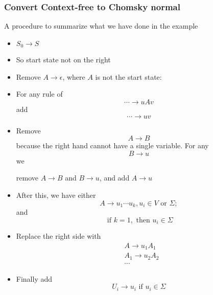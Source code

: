 




\begin{frame}[allowframebreaks] \frametitle{Convert Context-free to Chomsky normal}

  A procedure to summarize what we have done in the example
  
  \begin{itemize}
\item $S_0 \rightarrow S$

\item [] So start state not on the right
\item Remove $A \rightarrow \epsilon$, where $A$ is not the start state:
\item[] For any rule of
  \begin{equation*}
\cdots  \rightarrow uAv 
\end{equation*}
 add
 \begin{equation*}
\cdots \rightarrow uv
\end{equation*}
\item Remove
  \begin{equation*}
  A \rightarrow B
\end{equation*}
because the right hand cannot have a single variable.
For any
\begin{equation*}
  B \rightarrow u
\end{equation*}
we
\begin{center}
remove $A \rightarrow B$ and   $B \rightarrow u$,
and add $A \rightarrow u$
\end{center}
\item After this, we have either
  \begin{equation*}
    A \rightarrow u_1 \cdots u_k, u_i \in V
      \mbox{ or } \Sigma;
\end{equation*}
and 
\begin{equation*}
\mbox{ if }
k = 1, \mbox{ then } u_i \in \Sigma
\end{equation*}
\item Replace the right side with
  \begin{equation*}
    \begin{split}
& A \rightarrow u_1A_1 \\
& A_1 \rightarrow u_2A_2 \\
& \cdots
\end{split}
\end{equation*}
\item Finally add
  \begin{equation*}
U_i \rightarrow u_i \text{ if } u_i \in \Sigma    
  \end{equation*}
\end{itemize}\end{frame}

